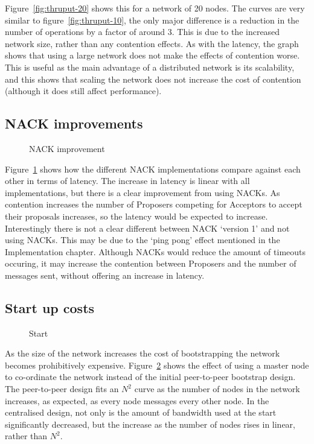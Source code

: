 \documentclass[12pt,twoside,notitlepage]{report}
\newcommand{\lwincludegraphics}[2][]{%
  \sbox{0}{\texttt{[image: \#2]}}%
  \ifdim\wd0>\linewidth
    \resizebox{\linewidth}{!}{\box0 }%
  \else
    \leavevmode\box0
  \fi}
\begin{document}
Figure~\ref{fig:thruput-20} shows this for a network of 20 nodes. The curves are very similar to
figure~\ref{fig:thruput-10}, the only major difference is a reduction in the number of operations
by a factor of around 3. This is due to the increased network size, rather than any contention
effects. As with the latency, the graph shows that using a large network does not make the effects
of contention worse. This is useful as the main advantage of a distributed network is its
scalability, and this shows that scaling the network does not increase the cost of contention
(although it does still affect performance).

\subsection{NACK improvements}

\begin{figure}[Hhtb]
\centering
\lwincludegraphics[scale=2]{figs/lat_nack.eps}
\caption{\label{fig:nack}NACK improvement}
\end{figure}

Figure~\ref{fig:nack} shows how the different NACK implementations compare against each other in
terms of latency. The increase in latency is linear with all implementations, but there is a clear
improvement from using NACKs. As contention increases the number of Proposers competing for
Acceptors to accept their proposals increases, so the latency would be expected to increase.
Interestingly there is not a clear different between NACK `version 1' and not using NACKs. This
may be due to the `ping pong' effect mentioned in the Implementation chapter. Although NACKs would
reduce the amount of timeouts occuring, it may increase the contention between Proposers and the
number of messages sent, without offering an increase in latency.

\subsection{Start up costs}

\begin{figure}[Hhtb]
\centering
\lwincludegraphics[scale=2]{figs/start.eps}
\caption{\label{fig:start}Start}
\end{figure}

As the size of the network increases the cost of bootstrapping the network becomes prohibitively
expensive. Figure~\ref{fig:start} shows the effect of using a master node to co-ordinate the
network instead of the initial peer-to-peer bootstrap design. The peer-to-peer design fits an
$N^2$ curve as the number of nodes in the network increases, as expected, as every node messages
every other node. In the centralised design, not only is the amount of bandwidth used at the start
significantly decreased, but the increase as the number of nodes rises in linear, rather than
$N^2$.
\end{document}
